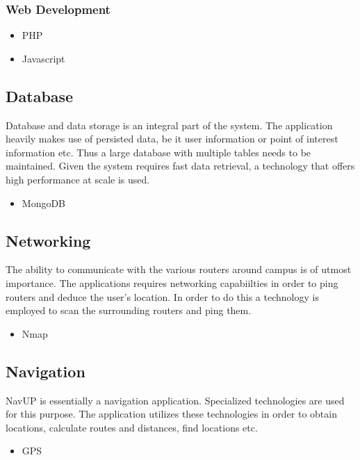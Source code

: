 \documentclass{article}
\begin{document}
		\subsubsection{Web Development}
			\begin{itemize}
				\item PHP
				\item Javascript
			\end{itemize}
	\subsection{Database}
Database and data storage is an integral part of the system.  The application heavily makes use of persisted data, be it user information or point of interest information etc.  Thus a large database with multiple tables needs to be maintained.  Given the system requires fast data retrieval, a technology that offers high performance at scale is used.
		\begin{itemize}
			\item MongoDB
		\end{itemize}
	\subsection{Networking}	
The ability to communicate with the various routers around campus is of utmost importance.  The applications requires networking capabiilties in order to ping routers and deduce the user's location.  In order to do this a technology is employed to scan the surrounding routers and ping them.
		\begin{itemize}
			\item Nmap
		\end{itemize}
	\subsection{Navigation}
NavUP is essentially a navigation application.  Specialized technologies are used for this purpose.  The application utilizes these technologies in order to obtain locations, calculate routes and distances, find locations etc.  
		\begin{itemize}
			\item GPS
		\end{itemize}
\end{document}

